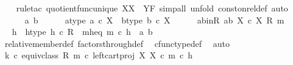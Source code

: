\begin{isabellebody}
\ \ \isamarkupfalse%
\ {\isacharparenleft}{\kern0pt}rule{\isacharunderscore}{\kern0pt}tac\ quotient{\isacharunderscore}{\kern0pt}func{\isacharunderscore}{\kern0pt}unique{\isacharbrackleft}{\kern0pt}\ X{\isacharequal}{\kern0pt}X{\isacharcomma}{\kern0pt}\ \ Y{\isacharequal}{\kern0pt}F{\isacharbrackright}{\kern0pt}{\isacharcomma}{\kern0pt}\ simp{\isacharunderscore}{\kern0pt}all{\isacharcomma}{\kern0pt}\ unfold\ const{\isacharunderscore}{\kern0pt}on{\isacharunderscore}{\kern0pt}rel{\isacharunderscore}{\kern0pt}def{\isacharcomma}{\kern0pt}\ auto{\isacharparenright}{\kern0pt}\isanewline
\ \ \ \ \isamarkupfalse%
\ a\ b\isanewline
\ \ \ \ \isamarkupfalse%
\ a{\isacharunderscore}{\kern0pt}type{\isacharcolon}{\kern0pt}\ {\isachardoublequoteopen}a\ {\isasymin}\isactrlsub c\ X{\isachardoublequoteclose}\ \ b{\isacharunderscore}{\kern0pt}type{\isacharcolon}{\kern0pt}\ {\isachardoublequoteopen}b\ {\isasymin}\isactrlsub c\ X{\isachardoublequoteclose}\isanewline
\ \ \ \ \isamarkupfalse%
\ ab{\isacharunderscore}{\kern0pt}in{\isacharunderscore}{\kern0pt}R{\isacharcolon}{\kern0pt}\ {\isachardoublequoteopen}{\isasymlangle}a{\isacharcomma}{\kern0pt}b{\isasymrangle}\ {\isasymin}\isactrlbsub X\ {\isasymtimes}\isactrlsub c\ X\isactrlesub \ {\isacharparenleft}{\kern0pt}R{\isacharcomma}{\kern0pt}\ m{\isacharparenright}{\kern0pt}{\isachardoublequoteclose}\isanewline
\ \ \ \ \isamarkupfalse%
\ \isamarkupfalse%
\ h\ \ h{\isacharunderscore}{\kern0pt}type{\isacharcolon}{\kern0pt}\ {\isachardoublequoteopen}h\ {\isasymin}\isactrlsub c\ R{\isachardoublequoteclose}\ \ m{\isacharunderscore}{\kern0pt}h{\isacharunderscore}{\kern0pt}eq{\isacharcolon}{\kern0pt}\ {\isachardoublequoteopen}m\ {\isasymcirc}\isactrlsub c\ h\ {\isacharequal}{\kern0pt}\ {\isasymlangle}a{\isacharcomma}{\kern0pt}\ b{\isasymrangle}{\isachardoublequoteclose}\isanewline
\ \ \ \ \ \ \isamarkupfalse%
\ relative{\isacharunderscore}{\kern0pt}member{\isacharunderscore}{\kern0pt}def\ factors{\isacharunderscore}{\kern0pt}through{\isacharunderscore}{\kern0pt}def\ \isamarkupfalse%
\ cfunc{\isacharunderscore}{\kern0pt}type{\isacharunderscore}{\kern0pt}def\ \isamarkupfalse%
\ auto\ \isanewline
\ \ \ \ \isanewline
\ \ \ \ \isamarkupfalse%
\ {\isachardoublequoteopen}{\isacharparenleft}{\kern0pt}k\ {\isasymcirc}\isactrlsub c\ equiv{\isacharunderscore}{\kern0pt}class\ {\isacharparenleft}{\kern0pt}R{\isacharcomma}{\kern0pt}\ m{\isacharparenright}{\kern0pt}{\isacharparenright}{\kern0pt}\ {\isasymcirc}\isactrlsub c\ left{\isacharunderscore}{\kern0pt}cart{\isacharunderscore}{\kern0pt}proj\ X\ X\ {\isasymcirc}\isactrlsub c\ m\ {\isasymcirc}\isactrlsub c\ h\ {\isacharequal}{\kern0pt}\isanewline

\end{isabellebody}
